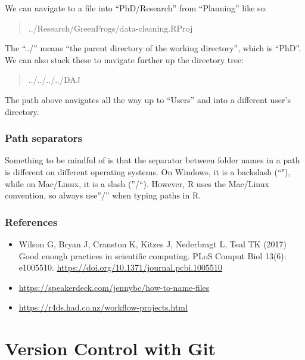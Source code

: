 \documentclass[
]{book}
\providecommand{\tightlist}{%
  \setlength{\itemsep}{0pt}\setlength{\parskip}{0pt}}
\begin{document}
We can navigate to a file into ``PhD/Research'' from ``Planning'' like so:

\begin{quote}
../Research/GreenFrogs/data-cleaning.RProj
\end{quote}

The ``../'' means ``the parent directory of the working directory'', which is ``PhD''. We can also stack these to navigate further up the directory tree:

\begin{quote}
../../../../DAJ
\end{quote}

The path above navigates all the way up to ``Users'' and into a different user's directory.

\hypertarget{path-separators}{%
\subsection{Path separators}\label{path-separators}}

Something to be mindful of is that the separator between folder names in a path is different on different operating systems. On Windows, it is a backslash (``"), while on Mac/Linux, it is a slash (''/``). However, R uses the Mac/Linux convention, so always use''/'' when typing paths in R.

\hypertarget{references}{%
\subsection{References}\label{references}}

\begin{itemize}
\tightlist
\item
  Wilson G, Bryan J, Cranston K, Kitzes J, Nederbragt L, Teal TK (2017) Good enough practices in scientific computing. PLoS Comput Biol 13(6): e1005510. \url{https://doi.org/10.1371/journal.pcbi.1005510}
\item
  \url{https://speakerdeck.com/jennybc/how-to-name-files}
\item
  \url{https://r4ds.had.co.nz/workflow-projects.html}
\end{itemize}

\hypertarget{version-control-git}{%
\chapter{Version Control with Git}\label{version-control-git}}
\end{document}
